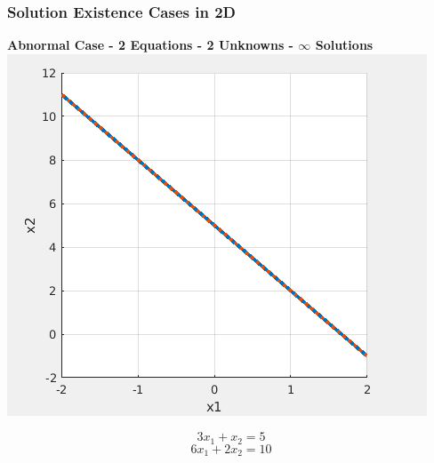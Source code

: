 \documentclass[fleqn]{beamer} %
\newcommand{\sectionIIIsubsectionIIItitle}{Solution Existence Cases in 2D}
\begin{document}
			\begin{frame}
				\frametitle{\sectionIIIsubsectionIIItitle}
				\bigskip

				{\bf Abnormal Case - 2 Equations - 2 Unknowns - $\infty$ Solutions}  \\ \vspace{2mm}
				\includegraphics[scale=.3]{images/lecture5_fig2.png} \\
				\begin{fleqn}
					\[3x_1+x_2=5\]
					\[6x_1+2x_2=10\]
				\end{fleqn}

				\btVFill
			\end{frame}
\end{document}
